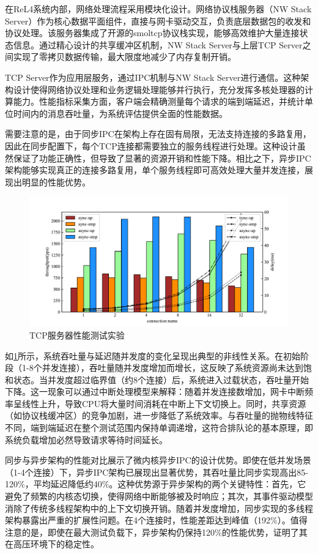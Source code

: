 在ReL4系统内部，网络处理流程采用模块化设计。网络协议栈服务器（NW Stack Server）作为核心数据平面组件，直接与网卡驱动交互，负责底层数据包的收发和协议处理。该服务器集成了开源的smoltcp协议栈实现，能够高效维护大量连接状态信息。通过精心设计的共享缓冲区机制，NW Stack Server与上层TCP Server之间实现了零拷贝数据传输，最大限度地减少了内存复制开销。

TCP Server作为应用层服务，通过IPC机制与NW Stack Server进行通信。这种架构设计使得网络协议处理和业务逻辑处理能够并行执行，充分发挥多核处理器的计算能力。性能指标采集方面，客户端会精确测量每个请求的端到端延迟，并统计单位时间内的消息吞吐量，为系统评估提供全面的性能数据。

需要注意的是，由于同步IPC在架构上存在固有局限，无法支持连接的多路复用，因此在同步配置下，每个TCP连接都需要独立的服务线程进行处理。这种设计虽然保证了功能正确性，但导致了显著的资源开销和性能下降。相比之下，异步IPC架构能够实现真正的连接多路复用，单个服务线程即可高效处理大量并发连接，展现出明显的性能优势。

\begin{figure}[htbp]
    \centering
    \includegraphics[width=1.0\textwidth]{figures/tcp_test.pdf}
    \caption{TCP服务器性能测试实验}\label{fig:tcp_test_res}
\end{figure}

如\ref{fig:tcp_test_res}所示，系统吞吐量与延迟随并发度的变化呈现出典型的非线性关系。在初始阶段（1-8个并发连接），吞吐量随并发度增加而增长，这反映了系统资源尚未达到饱和状态。当并发度超过临界值（约8个连接）后，系统进入过载状态，吞吐量开始下降。这一现象可以通过中断处理模型来解释：随着并发连接数增加，网卡中断频率呈线性上升，导致CPU将大量时间消耗在中断上下文切换上。同时，共享资源（如协议栈缓冲区）的竞争加剧，进一步降低了系统效率。与吞吐量的抛物线特征不同，端到端延迟在整个测试范围内保持单调递增，这符合排队论的基本原理，即系统负载增加必然导致请求等待时间延长。

同步与异步架构的性能对比展示了微内核异步IPC的设计优势。即使在低并发场景（1-4个连接）下，异步IPC架构已展现出显著优势，其吞吐量比同步实现高出85-120\%，平均延迟降低约40\%。这种优势源于异步架构的两个关键特性：首先，它避免了频繁的内核态切换，使得网络中断能够被及时响应；其次，其事件驱动模型消除了传统多线程架构中的上下文切换开销。随着并发度增加，同步实现的多线程架构暴露出严重的扩展性问题。在4个连接时，性能差距达到峰值（192\%）。值得注意的是，即使在最大测试负载下，异步架构仍保持120\%的性能优势，证明了其在高压环境下的稳定性。

